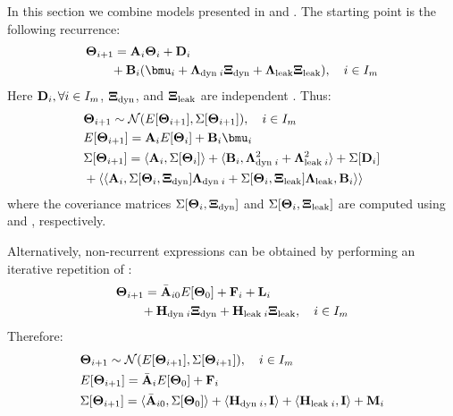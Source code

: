 In this section we combine models presented in  and . The starting point is the following recurrence:
\begin{align} \equlabel{fourier-recurrence-noise-process-variation}
  & \vtemp_{i + 1} = \m{A}_i \vtemp_i + \m{D}_i \nonumber \\
  & {} \qquad + \m{B}_i (\vmean{i} + \ddev{\dyn \; i} \vnormal_\dyn + \ddev{\leak} \vnormal_\leak), \sep i \in \timeindex
\end{align}
Here $\mathbf{D}_i, \forall i \in I_m$, $\mathbf{\Xi}_{\text{dyn}}$, and $\mathbf{\Xi}_{\text{leak}}$ are independent \mnrvs. Thus:
\begin{align}
  & \vtemp_{i + 1} \sim \normal(\expect{\vtemp_{i + 1}}, \cov{\vtemp_{i + 1}}), \sep i \in \timeindex \equlabel{tta-process-variation-noise-probabilistic-recurrence} \\
  & \expect{\vtemp_{i + 1}} = \m{A}_i \expect{\vtemp_i} + \m{B}_i \vmean{i} \nonumber \\
  & \cov{\vtemp_{i + 1}} = \dbl{\m{A}_i, \cov{\vtemp_i}} + \dbl{\m{B}_i, \ddev{\dyn \; i}^2 + \ddev{\leak \; i}^2} + \cov{\m{D}_i} \nonumber \\
  & {} + \ddbl{\m{A}_i, \cov{\vtemp_i, \vnormal_\dyn} \ddev{\dyn \; i} + \cov{\vtemp_i, \vnormal_\leak} \ddev{\leak}, \m{B}_i} \nonumber
\end{align}
where the coveriance matrices $\Sigma[\mathbf{\Theta}_i, \mathbf{\Xi}_{\text{dyn}}]$ and $\Sigma[\mathbf{\Theta}_i, \mathbf{\Xi}_{\text{leak}}]$ are computed using  and , respectively.

Alternatively, non-recurrent expressions can be obtained by performing an iterative repetition of :
\begin{align} \equlabel{tta-fourier-non-recurrent-combined}
  & \vtemp_{i + 1} = \am{A}_{i0} \expect{\vtemp_0} + \v{F}_i + \v{L}_i \nonumber \\
  & { } \qquad + \v{H}_{\dyn \; i} \vnormal_\dyn + \v{H}_{\leak \; i} \vnormal_\leak, \sep i \in \timeindex
\end{align}
Therefore:
\begin{align}
  & \vtemp_{i + 1} \sim \normal(\expect{\vtemp_{i + 1}}, \cov{\vtemp_{i + 1}}), \sep i \in \timeindex \equlabel{tta-probabilistic-non-recurrent-combined} \\
  & \expect{\vtemp_{i + 1}} = \am{A}_i \expect{\vtemp_0} + \v{F}_i \nonumber \\
  & \cov{\vtemp_{i + 1}} = \dbl{\am{A}_{i0}, \cov{\vtemp_0}} + \dbl{\v{H}_{\dyn \; i}, \mone} + \dbl{\v{H}_{\leak \; i}, \mone} + \m{M}_i \nonumber
\end{align}
